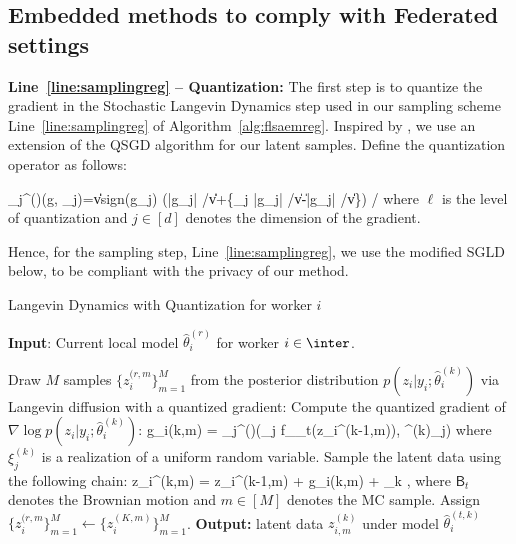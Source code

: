 \documentclass[11pt]{article}
\theoremstyle{t}
\begin{document}
\subsection{Embedded methods to comply with Federated settings}

\textbf{Line~\ref{line:samplingreg} -- Quantization:} 
The first step is to quantize the gradient in the Stochastic Langevin Dynamics step used in our sampling scheme Line~\ref{line:samplingreg} of Algorithm~\ref{alg:flsaemreg}.
Inspired by \citep{alistarh2017qsgd}, we use an extension of the QSGD algorithm for our latent samples.
Define the quantization operator as follows:

\beq\label{eq:operator}
_{j}^{(\ell)}\left(g, \xi_{j}\right)=\|v\| \cdot \textrm{sign}\left(g_{j}\right) \cdot\left(\left\lfloor \ell \left|g_{j}\right| /\|v\|\right\rfloor+\left\{\xi_{j} \leq \ell \left|g_{j}\right| /\|v\|-\left\lfloor \ell \left|g_{j}\right| /\|v\|\right\rfloor\right\}\right) /\ell
\eeq
where $\ell$ is the level of quantization and $j \in [d]$ denotes the dimension of the gradient.

Hence, for the sampling step, Line~\ref{line:samplingreg}, we use the modified SGLD below, to be compliant with the privacy of our method.
\begin{algorithm}[H]
\caption{Langevin Dynamics with Quantization for worker $i$} \label{alg:quant}
\begin{algorithmic}[1]
\STATE \textbf{Input}: Current local model $\hat{\theta}^{(r)}_i$ for worker $i \in \inter$.

\STATE Draw $M$ samples $\{ z_{i}^{(r,m} \}_{m=1}^M$ from the posterior distribution $p(z_i| y_i; \hat{\theta}^{(k)}_i)$ via Langevin diffusion with a quantized gradient:\label{line:langevin}
\STATE Compute the quantized gradient of $\nabla \log p(z_i| y_i; \hat{\theta}^{(k)}_i)$:
\beq\label{eq:grad}
g_i{(k,m)} = _{j}^{(\ell)}\left(\nabla_j f_{\theta_t}(z_i^{(k-1,m)}), \xi^{(k)}_{j}\right)
\eeq
where $\xi^{(k)}_{j}$ is a realization of a uniform random variable.
\STATE Sample the latent data using the following chain:
\beq\label{eq:lang}
z_i^{(k,m)} = z_i^{(k-1,m)} +   g_i{(k,m)} +   _k \eqsp,
\eeq
where $\mathsf{B}_t$ denotes the Brownian motion and $m \in [M]$ denotes the MC sample.
\ENDFOR
\STATE Assign $\{ z_{i}^{(r,m} \}_{m=1}^M \leftarrow \{ z_i^{(K,m)} \}_{m=1}^M$.
\STATE \textbf{Output:} latent data $z_{i,m}^{(k)}$ under model $\hat{\theta}^{(t,k)}_i$ 
\end{algorithmic}
\end{algorithm}
\end{document}
